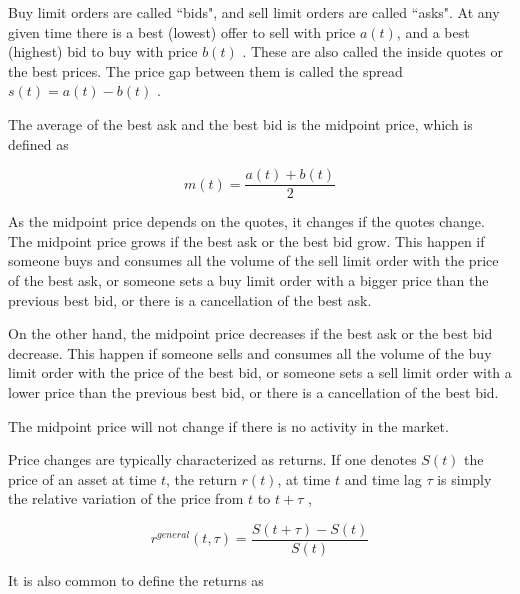 Buy limit orders are called ``bids", and sell limit orders are called ``asks".
At any given time there is a best (lowest) offer to sell with price
$a\left(t\right)$, and a best (highest) bid to buy with price
$b\left(t\right)$ \cite{subtle_nature}. These are also called the inside quotes
or the best prices. The price gap between them is called the spread
$s\left(t\right) = a\left(t\right)-b\left(t\right)$
\cite{large_prices_changes,Bouchaud_2004,subtle_nature}.

The average of the best ask and the best bid is the midpoint price, which is
defined as \cite{Bouchaud_2004,large_prices_changes,subtle_nature}

\begin{equation}\label{eq:midpoint_price}
    m\left(t\right)=\frac{a\left(t\right)+b\left(t\right)}{2}
\end{equation}

As the midpoint price depends on the quotes, it changes if the quotes change.
The midpoint price grows if the best ask or the best bid grow. This happen if
someone buys and consumes all the volume of the sell limit order with the price
of the best ask, or someone sets a buy limit order with a bigger price than the
previous best bid, or there is a cancellation of the best ask.

On the other hand, the midpoint price decreases if the best ask or the best bid
decrease. This happen if someone sells and consumes all the volume of the buy
limit order with the price of the best bid, or someone sets a sell limit order
with a lower price than the previous best bid, or there is a cancellation of
the best bid.

The midpoint price will not change if there is no activity in the market.

Price changes are typically characterized as returns. If one denotes
$S\left( t\right)$ the price of an asset at time $t$, the return
$r\left(t\right)$, at time $t$ and time lag $\tau$ is simply the relative
variation of the price from $t$ to $t + \tau$ \cite{subtle_nature,empirical_facts},

\begin{equation}\label{eq:return_general}
    r^{general} \left(t, \tau \right) = \frac{S\left(t + \tau\right)
    - S\left(t\right)}{S\left(t\right)}
\end{equation}

It is also common to define the returns as
\cite{empirical_properties,fluctions_market_friction,large_prices_changes,subtle_nature,theory_market_impact,empirical_facts,dissecting_cross,spread_changes_affect}


